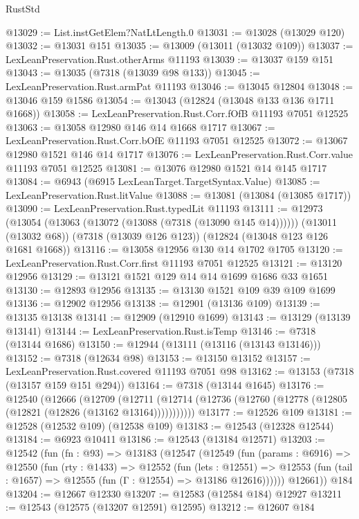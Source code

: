 \begin{lexlean}{RustStd}
\begin{coremodule}
@13029 := List.instGetElem?NatLtLength.{0}
@13031 := @13028 (@13029 @120)
@13032 := @13031 @151
@13035 := @13009 (@13011 (@13032 @109))
@13037 := LexLeanPreservation.Rust.otherArms @11193
@13039 := @13037 @159 @151
@13043 := @13035 (@7318 (@13039 @98 @133))
@13045 := LexLeanPreservation.Rust.armPat @11193
@13046 := @13045 @12804
@13048 := @13046 @159 @1586
@13054 := @13043 (@12824 (@13048 @133 @136 @1711 @1668))
@13058 := LexLeanPreservation.Rust.Corr.fOfB @11193 @7051 @12525
@13063 := @13058 @12980 @146 @14 @1668 @1717
@13067 := LexLeanPreservation.Rust.Corr.bOfE @11193 @7051 @12525
@13072 := @13067 @12980 @1521 @146 @14 @1717
@13076 := LexLeanPreservation.Rust.Corr.value @11193 @7051 @12525
@13081 := @13076 @12980 @1521 @14 @145 @1717
@13084 := @6943 (@6915 LexLeanTarget.TargetSyntax.Value)
@13085 := LexLeanPreservation.Rust.litValue
@13088 := @13081 (@13084 (@13085 @1717))
@13090 := LexLeanPreservation.Rust.typedLit @11193
@13111 := @12973
    (@13054 (@13063 (@13072 (@13088 (@7318 (@13090 @145 @14))))))
    (@13011 (@13032 @68))
    (@7318 (@13039 @126 @123))
    (@12824 (@13048 @123 @126 @1681 @1668))
@13116 := @13058 @12956 @130 @14 @1702 @1705
@13120 := LexLeanPreservation.Rust.Corr.first @11193 @7051 @12525
@13121 := @13120 @12956
@13129 := @13121 @1521 @129 @14 @14 @1699 @1686 @33 @1651
@13130 := @12893 @12956
@13135 := @13130 @1521 @109 @39 @109 @1699
@13136 := @12902 @12956
@13138 := @12901 (@13136 @109)
@13139 := @13135 @13138
@13141 := @12909 (@12910 @1699)
@13143 := @13129 (@13139 @13141)
@13144 := LexLeanPreservation.Rust.isTemp
@13146 := @7318 (@13144 @1686)
@13150 := @12944 (@13111 (@13116 (@13143 @13146)))
@13152 := @7318 (@12634 @98)
@13153 := @13150 @13152
@13157 := LexLeanPreservation.Rust.covered @11193 @7051 @98
@13162 := @13153 (@7318 (@13157 @159 @151 @294))
@13164 := @7318 (@13144 @1645)
@13176 := @12540
    (@12666
      (@12709
        (@12711 (@12714 (@12736 (@12760 (@12778 (@12805 (@12821 (@12826 (@13162 @13164)))))))))))
@13177 := @12526 @109
@13181 := @12528 (@12532 @109) (@12538 @109)
@13183 := @12543 (@12328 @12544)
@13184 := @6923 @10411
@13186 := @12543 (@13184 @12571)
@13203 := @12542
    (fun (fn : @93) =>
    @13183
      (@12547
        (@12549
          (fun (params : @6916) =>
          @12550
            (fun (rty : @1433) =>
            @12552
              (fun (lets : @12551) =>
              @12553 (fun (tail : @1657) => @12555 (fun (Γ : @12554) => @13186 @12616))))))
        @12661))
    @184
@13204 := @12667 @12330
@13207 := @12583 (@12584 @184) @12927
@13211 := @12543 (@12575 (@13207 @12591) @12595)
@13212 := @12607 @184

\end{coremodule}
\end{lexlean}

